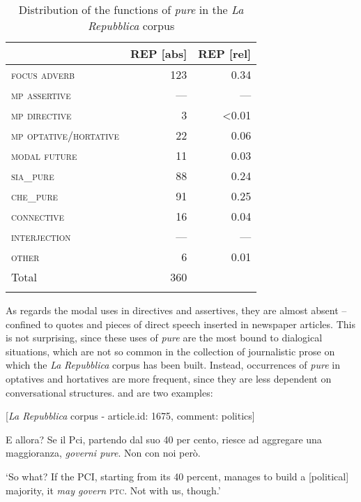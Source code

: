 \begin{table}
\begin{tabularx}{.8\textwidth}{Xrr}
\lsptoprule
 & REP [abs] & REP [rel]\\
 \midrule
\textsc{focus} \textsc{adverb} & 123 & {0.34}\\
\textsc{mp} \textsc{assertive} & — & —\\
\textsc{mp} \textsc{directive} & 3 & {<0.01}\\
\textsc{mp} \textsc{optative/hortative}  & 22 & {0.06}\\
\textsc{modal} \textsc{future} & 11 & {0.03}\\
\textsc{sia\_pure} & 88 & {0.24}\\
\textsc{che\_pure} & 91 & {0.25}\\
\textsc{connective} & 16 & {0.04}\\
\textsc{interjection} & — & —\\
\textsc{other} & 6 & {0.01}\\
\midrule
Total & 360 & \\
\lspbottomrule
\end{tabularx}
\caption{\label{tab:key:6.2} Distribution of the functions of \textit{pure}  in the \textit{La Repubblica}  corpus}
\end{table}

As regards the modal uses in directives and assertives, they are almost absent – confined to quotes and pieces of direct speech inserted in newspaper articles. This is not surprising, since these uses of \textit{pure} are the most bound to dialogical situations, which are not so common in the collection of journalistic prose on which the \textit{La} \textit{Repubblica} corpus has been built. Instead, occurrences of \textit{pure} in optatives and hortatives are more frequent, since they are less dependent on conversational structures.  and  are two examples:

\ea%
    \label{ex:key:38}

          [\textit{La Repubblica} corpus - article.id: 1675, comment: politics]

E allora? Se il Pci, partendo dal suo 40 per cento, riesce ad aggregare una maggioranza, \textit{governi pure}. Non con noi però.

\glt ‘So what? If the PCI, starting from its 40 percent, manages to build a [political] majority, it \textit{may govern} \textsc{ptc}. Not with us, though.’
    \z

\ea%
    \label{ex:key:39}

